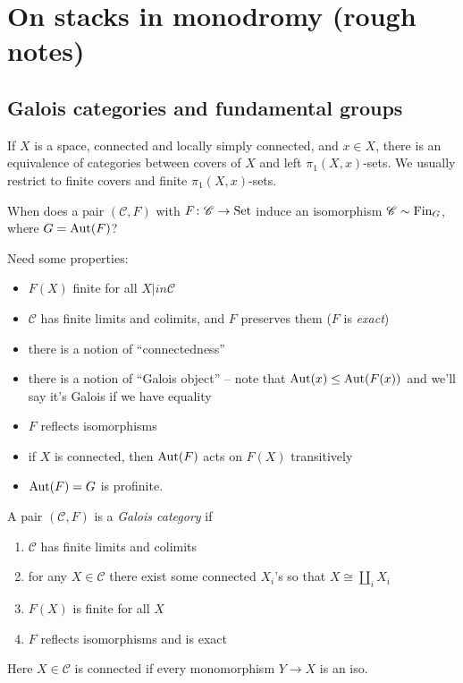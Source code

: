 \documentclass[11pt]{amsart}
\begin{document}
\section{On stacks in monodromy (rough notes)}

\subsection{Galois categories and fundamental groups}

If $X$ is a space, connected and locally simply connected, and $x\in X$, there is an equivalence of categories between covers of $X$ and left $\pi_1(X,x)$-sets. We usually restrict to finite covers and finite $\pi_1(X,x)$-sets.

\begin{question} When does a pair $(\mathscr{C},F)$ with $F \colon \mathscr{C} \to \mathrm{Set}$ induce an isomorphism $\mathscr{C} \sim \mathrm{Fin}_G$, where $G = \mathrm{Aut}(F)$?
\end{question}
Need some properties:
\begin{itemize}
    \item $F(X)$ finite for all $X|in \mathscr{C}$
    \item $\mathscr{C}$ has finite limits and colimits, and $F$ preserves them ($F$ is \textit{exact})
    \item there is a notion of ``connectedness''
    \item there is a notion of ``Galois object'' -- note that $\mathrm{Aut}(x) \le \mathrm{Aut}(F(x))$ and we'll say it's Galois if we have equality
    \item $F$ reflects isomorphisms
    \item if $X$ is connected, then $\mathrm{Aut}(F)$ acts on $F(X)$ transitively
    \item $\mathrm{Aut}(F) = G$ is profinite.
\end{itemize}

\begin{definition} A pair $(\mathscr{C},F)$ is a \textit{Galois category} if
\begin{enumerate}
    \item $\mathscr{C}$ has finite limits and colimits
    \item for any $X \in \mathscr{C}$ there exist some connected $X_i$'s so that $X \cong \amalg_i X_i$
    \item $F(X)$ is finite for all $X$
    \item $F$ reflects isomorphisms and is exact
\end{enumerate}
Here $X\in \mathscr{C}$ is connected if every monomorphism $Y \to X$ is an iso.
\end{definition}
\end{document}

